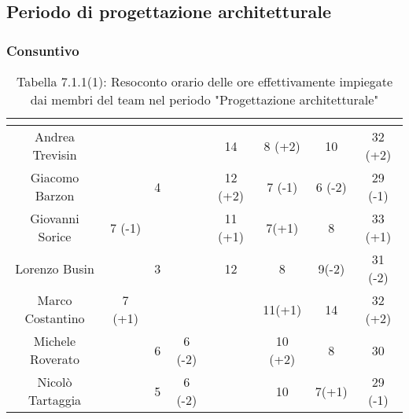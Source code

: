 \subsection{Periodo di progettazione architetturale}
\subsubsection{Consuntivo}
\renewcommand{\arraystretch}{1.5}
\begin{table}[H]
\begin{center}
\begin{tabular}{|c|c|c|c|c|c|c|c|}
\hline
\rowcolor{title_row}
\textbf{\color{title_text}{Nome}} & \textbf{\color{title_text}{Resp.}} & \textbf{\color{title_text}{Ammi.}} & \textbf{\color{title_text}{Analist.}} & \textbf{\color{title_text}{Progett.}} & \textbf{\color{title_text}{Program.}} & \textbf{\color{title_text}{Verific.}} & \textbf{\color{title_text}{Totale}} \\ \hline
Andrea Trevisin  & & & & 14 & 8 (+2) & 10 & 32 (+2)  \\ \hline
Giacomo Barzon   & & 4 & & 12 (+2) & 7 (-1) & 6 (-2) & 29 (-1)  \\ \hline
Giovanni Sorice  & 7 (-1) & & & 11 (+1) & 7(+1) & 8 & 33 (+1)  \\ \hline
Lorenzo Busin    & & 3 & & 12 & 8 & 9(-2) & 31 (-2)  \\ \hline
Marco Costantino & 7 (+1) & & & & 11(+1) & 14 & 32 (+2) \\ \hline
Michele Roverato & & 6 & 6 (-2) & & 10 (+2) & 8 & 30 \\ \hline
Nicolò Tartaggia & & 5 & 6 (-2) & & 10 & 7(+1) & 29 (-1)  \\ \hline
\end{tabular}
\caption{Tabella 7.1.1(1): Resoconto orario delle ore effettivamente impiegate dai membri del team nel periodo "Progettazione architetturale"\label{}}
\end{center}
\end{table}
\renewcommand{\arraystretch}{1}

